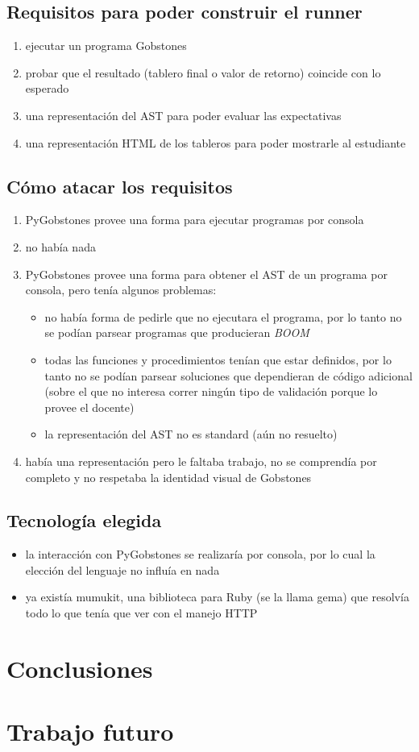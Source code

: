 \documentclass[a4paper,10pt]{article}
\newcommand{\borrador}[1]{{\color{blue}{\Large TODO:} {#1}}}
\begin{document}
\subsection{Requisitos para poder construir el runner}
\borrador{
  \begin{enumerate}
    \item ejecutar un programa Gobstones
    \item probar que el resultado (tablero final o valor de retorno) coincide con lo esperado
    \item una representación del AST para poder evaluar las expectativas
    \item una representación HTML de los tableros para poder mostrarle al estudiante
  \end{enumerate}
}

\subsection{Cómo atacar los requisitos}
\borrador{
  \begin{enumerate}
    \item PyGobstones provee una forma para ejecutar programas por consola
    \item no había nada
    \item PyGobstones provee una forma para obtener el AST de un programa por consola, pero tenía algunos problemas:
      \begin{itemize}
        \item no había forma de pedirle que no ejecutara el programa, por lo tanto no se podían parsear programas que producieran \textit{BOOM}
        \item todas las funciones y procedimientos tenían que estar definidos, por lo tanto no se podían parsear soluciones que dependieran de código adicional (sobre el que no interesa correr ningún tipo de validación porque lo provee el docente)
        \item la representación del AST no es standard (aún no resuelto)
      \end{itemize}
    \item había una representación pero le faltaba trabajo, no se comprendía por completo y no respetaba la identidad visual de Gobstones
  \end{enumerate}
}

\subsection{Tecnología elegida}
\borrador{
  \begin{itemize}
    \item la interacción con PyGobstones se realizaría por consola, por lo cual la elección del lenguaje no influía en nada
    \item ya existía mumukit, una biblioteca para Ruby (se la llama gema) que resolvía todo lo que tenía que ver con el manejo HTTP
  \end{itemize}
}

\section{Conclusiones}

\section{Trabajo futuro}
\end{document}
